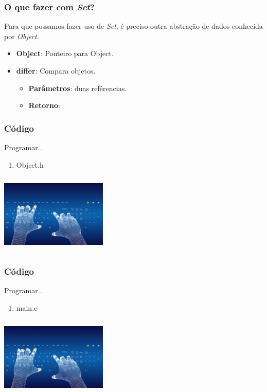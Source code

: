 \documentclass{beamer}
\begin{document}
\begin{frame}
 \frametitle{O que fazer com \textit{Set}?}
 Para que possamos fazer uso de \textit{Set}, é preciso outra abstração de 
  dados conhecida por \textit{Object}.
 \begin{itemize}
  \item \textbf{Object}: Ponteiro para Object.
  \item \textbf{differ}: Compara objetos.
  \begin{itemize}
   \item \textbf{Parâmetros}: duas refêrencias.
   \item \textbf{Retorno}: 
  \end{itemize}

 \end{itemize}
\end{frame}

\begin{frame}
  \frametitle{Código}
  Programar...
  \begin{enumerate}
   \item Object.h
  \end{enumerate}

  \begin{center}
    \includegraphics[height = 1.5in, width = 2in]{image/programming.jpg}
  \end{center}
\end{frame}

\begin{frame}
  \frametitle{Código}
  Programar...
  \begin{enumerate}
   \item main.c
  \end{enumerate}

  \begin{center}
    \includegraphics[height = 1.5in, width = 2in]{image/programming.jpg}
  \end{center}
\end{frame}
\end{document}
